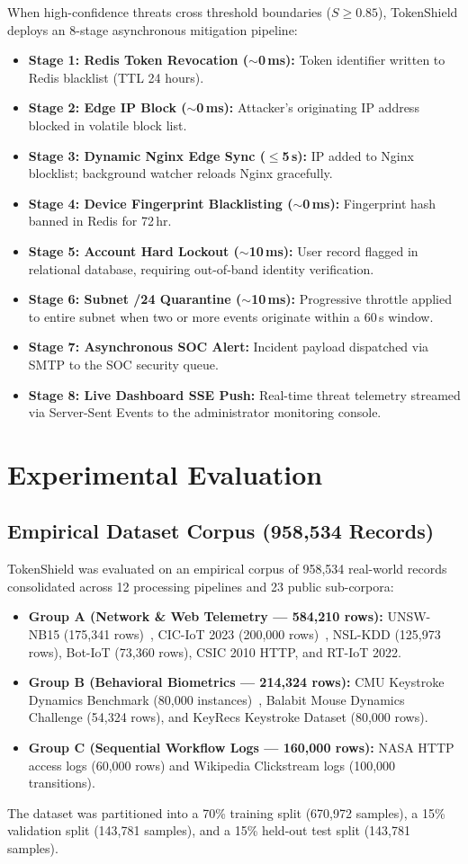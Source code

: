 \documentclass[conference]{IEEEtran}
\begin{document}
When high-confidence threats cross threshold boundaries ($S \ge 0.85$), TokenShield deploys an 8-stage asynchronous mitigation pipeline:
\begin{itemize}
    \item \textbf{Stage 1: Redis Token Revocation ($\sim$0\,ms):} Token identifier written to Redis blacklist (TTL 24 hours).
    \item \textbf{Stage 2: Edge IP Block ($\sim$0\,ms):} Attacker's originating IP address blocked in volatile block list.
    \item \textbf{Stage 3: Dynamic Nginx Edge Sync ($\le$5\,s):} IP added to Nginx blocklist; background watcher reloads Nginx gracefully.
    \item \textbf{Stage 4: Device Fingerprint Blacklisting ($\sim$0\,ms):} Fingerprint hash banned in Redis for 72\,hr.
    \item \textbf{Stage 5: Account Hard Lockout ($\sim$10\,ms):} User record flagged in relational database, requiring out-of-band identity verification.
    \item \textbf{Stage 6: Subnet /24 Quarantine ($\sim$10\,ms):} Progressive throttle applied to entire subnet when two or more events originate within a 60\,s window.
    \item \textbf{Stage 7: Asynchronous SOC Alert:} Incident payload dispatched via SMTP to the SOC security queue.
    \item \textbf{Stage 8: Live Dashboard SSE Push:} Real-time threat telemetry streamed via Server-Sent Events to the administrator monitoring console.
\end{itemize}

\section{Experimental Evaluation}

\subsection{Empirical Dataset Corpus (958,534 Records)}
TokenShield was evaluated on an empirical corpus of 958,534 real-world records consolidated across 12 processing pipelines and 23 public sub-corpora:
\begin{itemize}
    \item \textbf{Group A (Network \& Web Telemetry --- 584,210 rows):} UNSW-NB15 (175,341 rows)~\cite{ref5}, CIC-IoT 2023 (200,000 rows)~\cite{ref13}, NSL-KDD (125,973 rows), Bot-IoT (73,360 rows), CSIC 2010 HTTP, and RT-IoT 2022.
    \item \textbf{Group B (Behavioral Biometrics --- 214,324 rows):} CMU Keystroke Dynamics Benchmark (80,000 instances)~\cite{ref11}, Balabit Mouse Dynamics Challenge (54,324 rows), and KeyRecs Keystroke Dataset (80,000 rows).
    \item \textbf{Group C (Sequential Workflow Logs --- 160,000 rows):} NASA HTTP access logs (60,000 rows) and Wikipedia Clickstream logs (100,000 transitions).
\end{itemize}
The dataset was partitioned into a 70\% training split (670,972 samples), a 15\% validation split (143,781 samples), and a 15\% held-out test split (143,781 samples).
\end{document}
